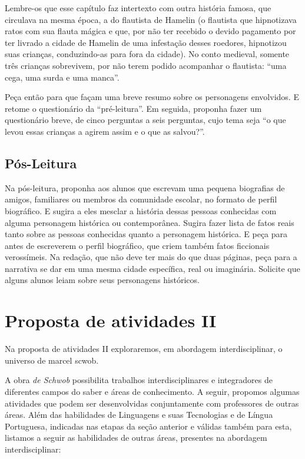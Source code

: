 \documentclass[12pt]{extarticle}
\begin{document}
Lembre-os que esse capítulo faz intertexto com outra história famosa, que circulava na mesma
época, a do flautista de Hamelin (o flautista que hipnotizava ratos com sua
flauta mágica e que, por não ter recebido o devido pagamento por ter livrado
a cidade de Hamelin de uma infestação desses roedores, hipnotizou suas
crianças, conduzindo-as para fora da cidade). No conto medieval, somente três
crianças sobrevivem, por não terem podido acompanhar o flautista: “uma cega,
uma surda e uma manca”.
 
Peça então para que façam uma breve resumo sobre os personagens envolvidos. 
E retome o questionário da ``pré-leitura''. Em seguida, proponha fazer um 
questionário breve, de cinco perguntas a seis perguntas, cujo tema 
seja ``o que levou essas crianças a agirem assim e o que as salvou?''.


\subsection{Pós-Leitura}

Na pós-leitura, proponha aos alunos que escrevam uma pequena biografias de amigos, familiares ou membros da comunidade escolar, no formato de perfil biográfico. E sugira a eles mesclar a história dessas
pessoas conhecidas com alguma personagem histórica ou contemporânea. Sugira
fazer lista de fatos reais tanto sobre as pessoas conhecidas quanto a personagem 
histórica. E peça para antes de escreverem o perfil biográfico, que criem também 
fatos ficcionais verossímeis. Na redação, que não deve ter mais do que duas páginas, 
peça para a narrativa se dar em uma mesma cidade específica, real ou imaginária. 
Solicite que alguns alunos leiam sobre seus personagens históricos.  

\section{Proposta de atividades II}

Na proposta de atividades II exploraremos, em abordagem interdisciplinar, 
o universo de marcel scwob.

A obra \emph{de Schwob} possibilita trabalhos interdisciplinares e
integradores de diferentes campos do saber e áreas de conhecimento. A
seguir, propomos algumas atividades que podem ser desenvolvidas
conjuntamente com professores de outras áreas. Além das habilidades de
Linguagens e suas Tecnologias e de Língua Portuguesa, indicadas nas
etapas da seção anterior e válidas também para esta, listamos a seguir
as habilidades de outras áreas, presentes na abordagem
interdisciplinar:
\end{document}

